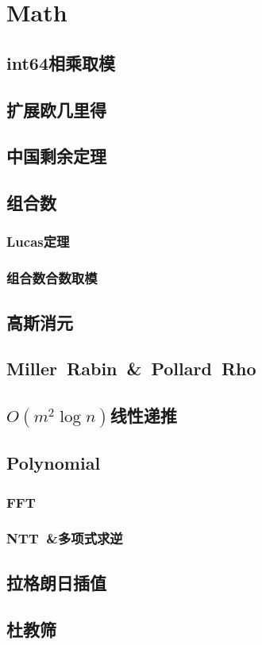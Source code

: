 \chapter{Math}
\section{int64相乘取模}
\section{扩展欧几里得}
\section{中国剩余定理}
\section{组合数}
\subsection{Lucas定理}
\subsection{组合数合数取模}
\section{高斯消元}
\section{Miller\ Rabin\ \&\ Pollard\ Rho}
\section{$ O(m ^ 2 \log n) $线性递推}
\section{Polynomial}
\subsection{FFT}
\subsection{NTT\ \&多项式求逆}
\section{拉格朗日插值}
\section{杜教筛}
